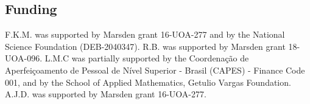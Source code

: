 \documentclass[oneside]{article}
\begin{document}
\subsection*{Funding}
F.K.M. was supported by Marsden grant 16-UOA-277 and by the National Science Foundation (DEB-2040347).
R.B. was supported by Marsden grant 18-UOA-096.
L.M.C was partially supported by the Coordenação de Aperfeiçoamento de
Pessoal de Nível Superior - Brasil (CAPES) - Finance Code 001, and by the School of Applied Mathematics,  Getulio Vargas Foundation.
A.J.D. was supported by Marsden grant 16-UOA-277.



\end{document}
